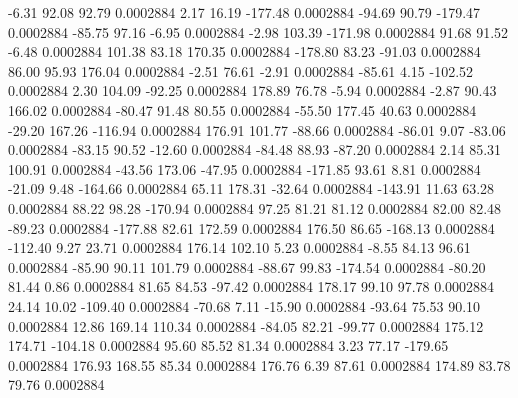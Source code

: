        -6.31       92.08       92.79     0.0002884
        2.17       16.19     -177.48     0.0002884
      -94.69       90.79     -179.47     0.0002884
      -85.75       97.16       -6.95     0.0002884
       -2.98      103.39     -171.98     0.0002884
       91.68       91.52       -6.48     0.0002884
      101.38       83.18      170.35     0.0002884
     -178.80       83.23      -91.03     0.0002884
       86.00       95.93      176.04     0.0002884
       -2.51       76.61       -2.91     0.0002884
      -85.61        4.15     -102.52     0.0002884
        2.30      104.09      -92.25     0.0002884
      178.89       76.78       -5.94     0.0002884
       -2.87       90.43      166.02     0.0002884
      -80.47       91.48       80.55     0.0002884
      -55.50      177.45       40.63     0.0002884
      -29.20      167.26     -116.94     0.0002884
      176.91      101.77      -88.66     0.0002884
      -86.01        9.07      -83.06     0.0002884
      -83.15       90.52      -12.60     0.0002884
      -84.48       88.93      -87.20     0.0002884
        2.14       85.31      100.91     0.0002884
      -43.56      173.06      -47.95     0.0002884
     -171.85       93.61        8.81     0.0002884
      -21.09        9.48     -164.66     0.0002884
       65.11      178.31      -32.64     0.0002884
     -143.91       11.63       63.28     0.0002884
       88.22       98.28     -170.94     0.0002884
       97.25       81.21       81.12     0.0002884
       82.00       82.48      -89.23     0.0002884
     -177.88       82.61      172.59     0.0002884
      176.50       86.65     -168.13     0.0002884
     -112.40        9.27       23.71     0.0002884
      176.14      102.10        5.23     0.0002884
       -8.55       84.13       96.61     0.0002884
      -85.90       90.11      101.79     0.0002884
      -88.67       99.83     -174.54     0.0002884
      -80.20       81.44        0.86     0.0002884
       81.65       84.53      -97.42     0.0002884
      178.17       99.10       97.78     0.0002884
       24.14       10.02     -109.40     0.0002884
      -70.68        7.11      -15.90     0.0002884
      -93.64       75.53       90.10     0.0002884
       12.86      169.14      110.34     0.0002884
      -84.05       82.21      -99.77     0.0002884
      175.12      174.71     -104.18     0.0002884
       95.60       85.52       81.34     0.0002884
        3.23       77.17     -179.65     0.0002884
      176.93      168.55       85.34     0.0002884
      176.76        6.39       87.61     0.0002884
      174.89       83.78       79.76     0.0002884
